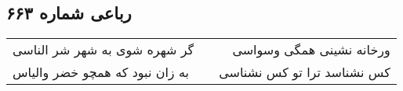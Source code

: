 \begin{center}
\section*{رباعی شماره ۶۶۳}
\label{sec:sh663}
\begin{longtable}{l p{0.5cm} r}
گر شهره شوی به شهر شر الناسی
&&
ورخانه نشینی همگی وسواسی
\\
به زان نبود که همچو خضر والیاس
&&
کس نشناسد ترا تو کس نشناسی
\\
\end{longtable}
\end{center}
